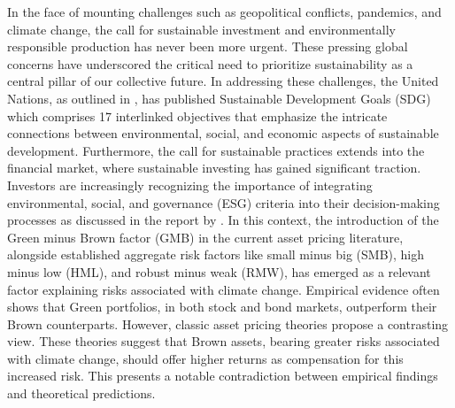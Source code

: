 \documentclass[12pt]{article}
\begin{document}
In the face of mounting challenges such as geopolitical conflicts, pandemics, and climate change, the call for sustainable investment and environmentally responsible production has never been more urgent. These pressing global concerns have underscored the critical need to prioritize sustainability as a central pillar of our collective future. In addressing these challenges, the United Nations, as outlined in \cite{fund2015sustainable}, has published Sustainable Development Goals (SDG) which comprises 17 interlinked objectives that emphasize the intricate connections between environmental, social, and economic aspects of sustainable development. Furthermore, the call for sustainable practices extends into the financial market, where sustainable investing has gained significant traction. Investors are increasingly recognizing the importance of integrating environmental, social, and governance (ESG) criteria into their decision-making processes as discussed in the report by \citet{BNPParibas2023}. In this context, the introduction of the Green minus Brown factor (GMB) in the current asset pricing literature, alongside established aggregate risk factors like small minus big (SMB), high minus low (HML), and robust minus weak (RMW), has emerged as a relevant factor explaining risks associated with climate change. Empirical evidence often shows that Green portfolios, in both stock and bond markets, outperform their Brown counterparts. However, classic asset pricing theories propose a contrasting view. These theories suggest that Brown assets, bearing greater risks associated with climate change, should offer higher returns as compensation for this increased risk. This presents a notable contradiction between empirical findings and theoretical predictions.
\end{document}
